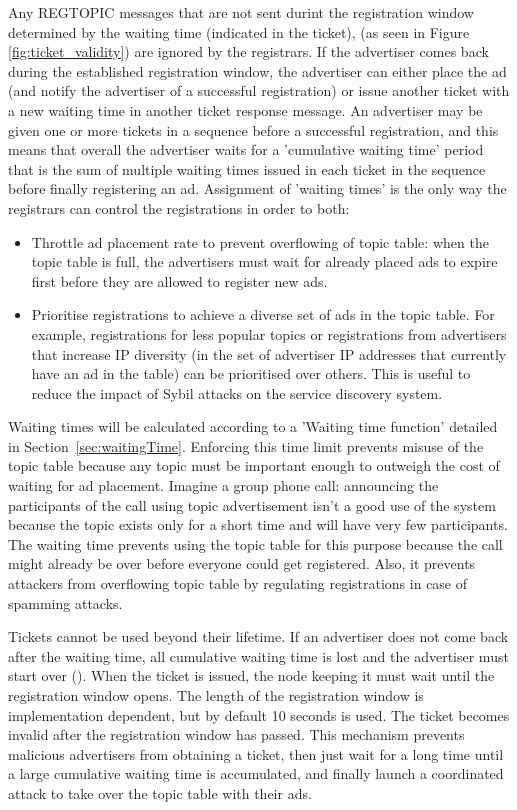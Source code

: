 Any REGTOPIC messages that are not sent durint the registration window determined by the waiting time (indicated in the ticket),   (as seen in Figure \ref{fig:ticket_validity}) are ignored by the registrars.  
If the advertiser comes back during the established registration window,  the advertiser can either place the ad (and notify the advertiser of a successful registration) or issue another ticket with a new waiting time in another ticket response message. 
An advertiser may be given one or more tickets in a sequence before a successful registration,  and this means that overall the advertiser waits for a 'cumulative waiting time' period that is the sum of multiple waiting times issued in each ticket in the sequence before finally registering an ad. 
Assignment of 'waiting times' is the only way the registrars can control the registrations in order to both:

\begin{itemize}
    \item Throttle ad placement rate to prevent overflowing of topic table: when the topic table is full, the advertisers must wait for already placed ads to expire first before they are allowed to register new ads.
    \item Prioritise registrations to achieve a diverse set of ads in the topic table. For example, registrations for less popular topics or registrations from advertisers that increase IP diversity (in the set of advertiser IP addresses that currently have an ad in the table) can be prioritised over others. This is useful to reduce the impact of Sybil attacks on the service discovery system.
\end{itemize}

Waiting times will be calculated according to a 'Waiting time function' detailed in Section~\ref{sec:waitingTime}.  Enforcing this time limit prevents misuse of the topic table because any topic must be important enough to outweigh the cost of waiting for ad placement. Imagine a group phone call: announcing the participants of the call using topic advertisement isn't a good use of the system because the topic exists only for a short time and will have very few participants. The waiting time prevents using the topic table for this purpose because the call might already be over before everyone could get registered. Also, it prevents attackers from overflowing topic table by regulating registrations in case of spamming attacks.

Tickets cannot be used beyond their lifetime. If an advertiser does not come back after the waiting time, all cumulative waiting time is lost and the advertiser must start over (). When the ticket is issued, the node keeping it must wait until the registration window opens. The length of the registration window is implementation dependent, but by default 10 seconds is used. The ticket becomes invalid after the registration window has passed. This mechanism prevents malicious advertisers from obtaining a ticket, then just wait for a long time until a large cumulative waiting time is accumulated, and finally launch a coordinated attack to take over the topic table with their ads.

